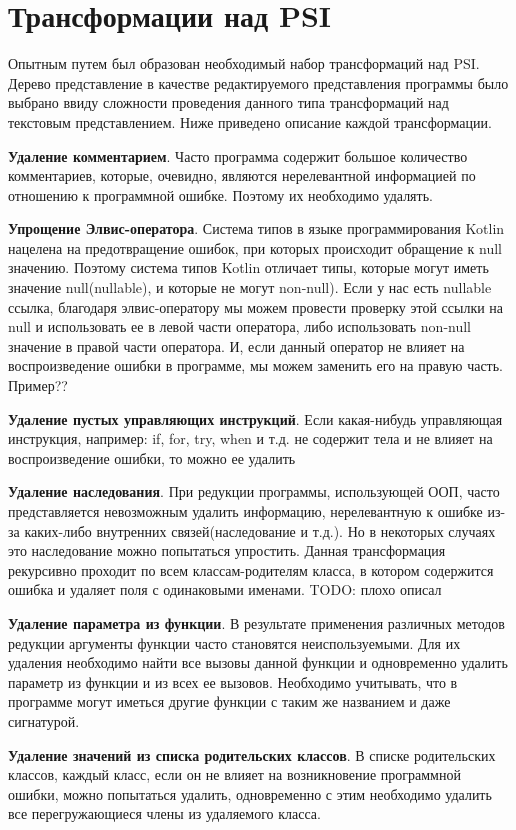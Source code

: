 \section{Трансформации над PSI}
Опытным путем был образован необходимый набор трансформаций над PSI. Дерево представление в качестве редактируемого представления программы было выбрано ввиду сложности проведения данного типа трансформаций над текстовым представлением. Ниже приведено описание каждой трансформации. 

\textbf{Удаление комментарием}. Часто программа содержит большое количество комментариев, которые, очевидно, являются нерелевантной информацией по отношению к программной ошибке. Поэтому их необходимо удалять.

\textbf{Упрощение Элвис-оператора}. Система типов в языке программирования Kotlin нацелена на предотвращение ошибок, при которых происходит обращение к null значению. Поэтому система типов Kotlin отличает типы, которые могут иметь значение null(nullable), и которые не могут non-null). Если у нас есть nullable ссылка, благодаря элвис-оператору мы можем провести проверку этой ссылки на null и использовать ее в левой части оператора, либо использовать non-null значение в правой части оператора. И, если данный оператор не влияет на воспроизведение ошибки в программе, мы можем заменить его на правую часть. Пример?? 

\textbf{Удаление пустых управляющих инструкций}. Если какая-нибудь управляющая инструкция, например: if, for, try, when и т.д. не содержит тела и не влияет на воспроизведение ошибки, то можно ее удалить

\textbf{Удаление наследования}. При редукции программы, использующей ООП, часто представляется невозможным удалить информацию, нерелевантную к ошибке из-за каких-либо внутренних связей(наследование и т.д.). Но в некоторых случаях это наследование можно попытаться упростить. Данная трансформация рекурсивно проходит по всем классам-родителям класса, в котором содержится ошибка и удаляет поля с одинаковыми именами. TODO: плохо описал

\textbf{Удаление параметра из функции}. В результате применения различных методов редукции аргументы функции часто становятся неиспользуемыми. Для их удаления необходимо найти все вызовы данной функции и одновременно удалить параметр из функции и из всех ее вызовов. Необходимо учитывать, что в программе могут иметься другие функции с таким же названием и даже сигнатурой.

\textbf{Удаление значений из списка родительских классов}. В списке родительских классов, каждый класс, если он не влияет на возникновение программной ошибки, можно попытаться удалить, одновременно с этим необходимо удалить все перегружающиеся члены из удаляемого класса.

